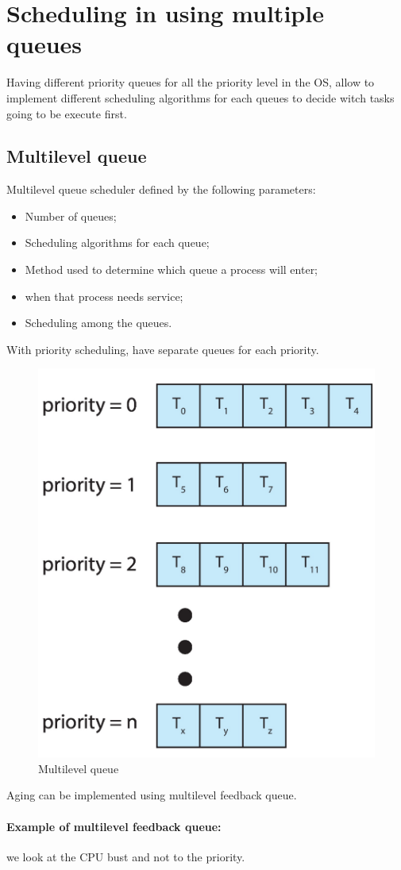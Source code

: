 \section{Scheduling in using multiple queues}

Having different priority queues for all the priority level in the OS, allow to implement different scheduling algorithms for each queues to decide witch tasks going to be execute first.

\subsection{Multilevel queue}
Multilevel queue scheduler defined by the following parameters:

\begin{itemize}
    \item Number of queues;
    \item Scheduling algorithms for each queue;
    \item Method used to determine which queue a process will enter;
    \item when that process needs service;
    \item Scheduling among the queues.
\end{itemize}


With priority scheduling, have separate queues for each priority.

\begin{figure}[htbp]
    \centering
    \includegraphics[width=0.35\linewidth]{img/multileve_queue.png}
    \caption{Multilevel queue}    
\end{figure}

Aging can be implemented using multilevel feedback queue.

\paragraph{Example of multilevel feedback queue: } we look at the CPU bust and not to the priority.

